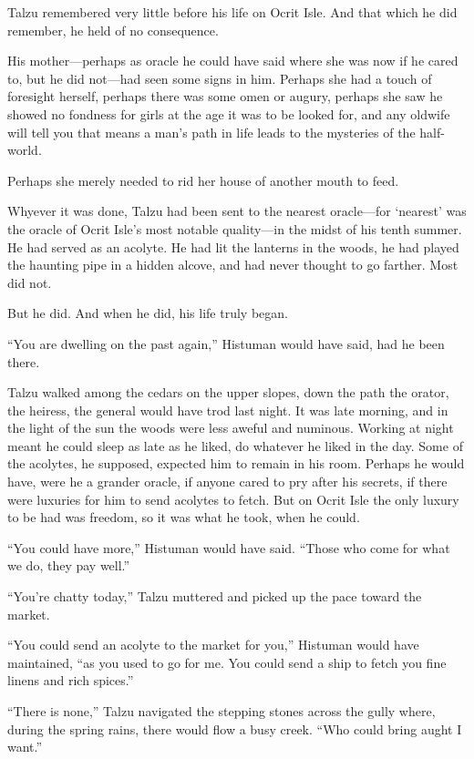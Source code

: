 \secdiv

Talzu remembered very little before his life on Ocrit Isle. And that which he did remember, he held of no consequence.

His mother---perhaps as oracle he could have said where she was now if he cared to, but he did not---had seen some signs in him. Perhaps she had a touch of foresight herself, perhaps there was some omen or augury, perhaps she saw he showed no fondness for girls at the age it was to be looked for, and any oldwife will tell you that means a man's path in life leads to the mysteries of the half-world.

Perhaps she merely needed to rid her house of another mouth to feed.

Whyever it was done, Talzu had been sent to the nearest oracle---for `nearest' was the oracle of Ocrit Isle's most notable quality---in the midst of his tenth summer. He had served as an acolyte. He had lit the lanterns in the woods, he had played the haunting pipe in a hidden alcove, and had never thought to go farther. Most did not.

But he did. And when he did, his life truly began.

\secdiv

``You are dwelling on the past again,'' Histuman would have said, had he been there.

Talzu walked among the cedars on the upper slopes, down the path the orator, the heiress, the general would have trod last night. It was late morning, and in the light of the sun the woods were less aweful and numinous. Working at night meant he could sleep as late as he liked, do whatever he liked in the day. Some of the acolytes, he supposed, expected him to remain in his room. Perhaps he would have, were he a grander oracle, if anyone cared to pry after his secrets, if there were luxuries for him to send acolytes to fetch. But on Ocrit Isle the only luxury to be had was freedom, so it was what he took, when he could.

``You could have more,'' Histuman would have said. ``Those who come for what we do, they pay well.''

``You're chatty today,'' Talzu muttered and picked up the pace toward the market.

``You could send an acolyte to the market for you,'' Histuman would have maintained, ``as you used to go for me. You could send a ship to fetch you fine linens and rich spices.''

``There is none,'' Talzu navigated the stepping stones across the gully where, during the spring rains, there would flow a busy creek. ``Who could bring aught I want.''

